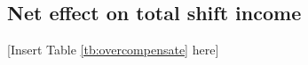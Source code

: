 \documentclass[reviewmode]{AEA}
\begin{document}





\subsection{Net effect on total shift income}

\begin{center}
	[Insert Table \ref{tb:overcompensate} here]
\end{center}
\end{document}
